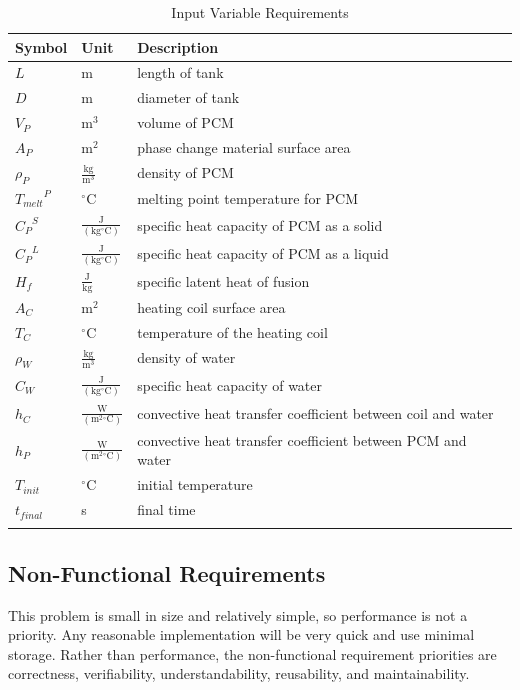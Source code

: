 \documentclass[12pt]{article}
\begin{document}
\begin{longtabu}{l l X[l]}
\toprule
Symbol & Unit & Description
\\
\midrule
$L$ & m & length of tank
\\
$D$ & m & diameter of tank
\\
${V_{P}}$ & $\text{m}^{3}$ & volume of PCM
\\
${A_{P}}$ & $\text{m}^{2}$ & phase change material surface area
\\
${ρ_{P}}$ & $\frac{\text{kg}}{\text{m}^{3}}$ & density of PCM
\\
${{T_{melt}}^{P}}$ & ${}^{\circ}$C & melting point temperature for PCM
\\
${{C_{P}}^{S}}$ & $\frac{\text{J}}{(\text{kg}{}^{\circ}\text{C})}$ & specific heat capacity of PCM as a solid
\\
${{C_{P}}^{L}}$ & $\frac{\text{J}}{(\text{kg}{}^{\circ}\text{C})}$ & specific heat capacity of PCM as a liquid
\\
${H_{f}}$ & $\frac{\text{J}}{\text{kg}}$ & specific latent heat of fusion
\\
${A_{C}}$ & $\text{m}^{2}$ & heating coil surface area
\\
${T_{C}}$ & ${}^{\circ}$C & temperature of the heating coil
\\
${ρ_{W}}$ & $\frac{\text{kg}}{\text{m}^{3}}$ & density of water
\\
${C_{W}}$ & $\frac{\text{J}}{(\text{kg}{}^{\circ}\text{C})}$ & specific heat capacity of water
\\
${h_{C}}$ & $\frac{\text{W}}{(\text{m}^{2}{}^{\circ}\text{C})}$ & convective heat transfer coefficient between coil and water
\\
${h_{P}}$ & $\frac{\text{W}}{(\text{m}^{2}{}^{\circ}\text{C})}$ & convective heat transfer coefficient between PCM and water
\\
${T_{init}}$ & ${}^{\circ}$C & initial temperature
\\
${t_{final}}$ & s & final time
\\
\bottomrule
\caption{Input Variable Requirements}
\label{Table:Input-Variable-Requirements}
\end{longtabu}
\subsection{Non-Functional Requirements}
\label{Sec:NFRs}
This problem is small in size and relatively simple, so performance is not a priority. Any reasonable implementation will be very quick and use minimal storage. Rather than performance, the non-functional requirement priorities are correctness, verifiability, understandability, reusability, and maintainability.
\end{document}
